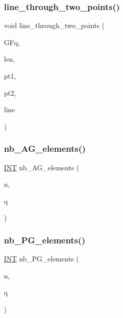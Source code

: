 \subsubsection{\texorpdfstring{line\+\_\+through\+\_\+two\+\_\+points()}{line\_through\_two\_points()}}
{\footnotesize\ttfamily void line\+\_\+through\+\_\+two\+\_\+points (\begin{DoxyParamCaption}\item[{\mbox{\hyperlink{classfinite__field}{finite\+\_\+field}} \&}]{G\+Fq,  }\item[{\mbox{\hyperlink{galois_8h_a09fddde158a3a20bd2dcadb609de11dc}{I\+NT}}}]{len,  }\item[{\mbox{\hyperlink{galois_8h_a09fddde158a3a20bd2dcadb609de11dc}{I\+NT}}}]{pt1,  }\item[{\mbox{\hyperlink{galois_8h_a09fddde158a3a20bd2dcadb609de11dc}{I\+NT}}}]{pt2,  }\item[{\mbox{\hyperlink{galois_8h_a09fddde158a3a20bd2dcadb609de11dc}{I\+NT}} $\ast$}]{line }\end{DoxyParamCaption})}

\mbox{\label{projective_8_c_ab9de2574dd403dd453a0d35107f684f5}} 
\subsubsection{\texorpdfstring{nb\+\_\+\+A\+G\+\_\+elements()}{nb\_AG\_elements()}}
{\footnotesize\ttfamily \mbox{\hyperlink{galois_8h_a09fddde158a3a20bd2dcadb609de11dc}{I\+NT}} nb\+\_\+\+A\+G\+\_\+elements (\begin{DoxyParamCaption}\item[{\mbox{\hyperlink{galois_8h_a09fddde158a3a20bd2dcadb609de11dc}{I\+NT}}}]{n,  }\item[{\mbox{\hyperlink{galois_8h_a09fddde158a3a20bd2dcadb609de11dc}{I\+NT}}}]{q }\end{DoxyParamCaption})}

\mbox{\label{projective_8_c_ada56c56cb5c7b39553dc0391f2df1cee}} 
\subsubsection{\texorpdfstring{nb\+\_\+\+P\+G\+\_\+elements()}{nb\_PG\_elements()}}
{\footnotesize\ttfamily \mbox{\hyperlink{galois_8h_a09fddde158a3a20bd2dcadb609de11dc}{I\+NT}} nb\+\_\+\+P\+G\+\_\+elements (\begin{DoxyParamCaption}\item[{\mbox{\hyperlink{galois_8h_a09fddde158a3a20bd2dcadb609de11dc}{I\+NT}}}]{n,  }\item[{\mbox{\hyperlink{galois_8h_a09fddde158a3a20bd2dcadb609de11dc}{I\+NT}}}]{q }\end{DoxyParamCaption})}

